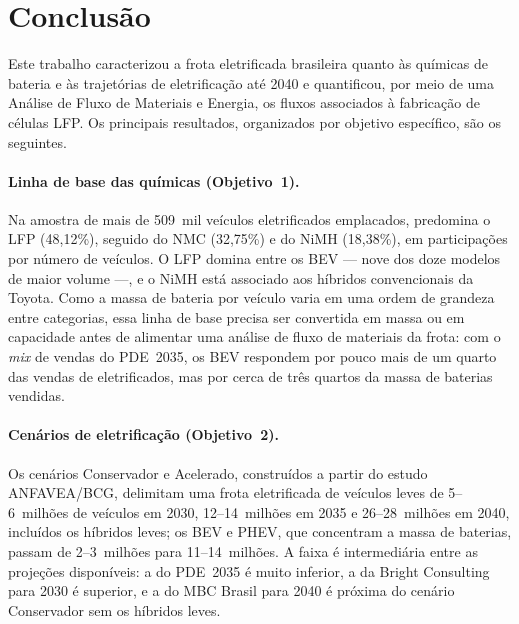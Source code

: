 \newpage
\section{Conclusão}
\label{sec:conclusao}

Este trabalho caracterizou a frota eletrificada brasileira quanto às químicas de
bateria e às trajetórias de eletrificação até 2040 e quantificou, por meio de uma
Análise de Fluxo de Materiais e Energia, os fluxos associados à fabricação de
células LFP. Os principais resultados, organizados por objetivo específico, são
os seguintes.

\paragraph{Linha de base das químicas (Objetivo~1).}
Na amostra de mais de 509~mil veículos eletrificados emplacados, predomina o LFP
(48,12\%), seguido do NMC (32,75\%) e do NiMH (18,38\%), em participações por
número de veículos. O LFP domina entre os BEV — nove dos doze modelos de maior
volume —, e o NiMH está associado aos híbridos convencionais da Toyota. Como a
massa de bateria por veículo varia em uma ordem de grandeza entre categorias, essa
linha de base precisa ser convertida em massa ou em capacidade antes de alimentar
uma análise de fluxo de materiais da frota: com o \textit{mix} de vendas do
PDE~2035, os BEV respondem por pouco mais de um quarto das vendas de eletrificados,
mas por cerca de três quartos da massa de baterias vendidas.

\paragraph{Cenários de eletrificação (Objetivo~2).}
Os cenários Conservador e Acelerado, construídos a partir do estudo ANFAVEA/BCG,
delimitam uma frota eletrificada de veículos leves de 5--6~milhões de veículos em
2030, 12--14~milhões em 2035 e 26--28~milhões em 2040, incluídos os híbridos leves;
os BEV e PHEV, que concentram a massa de baterias, passam de 2--3~milhões para
11--14~milhões. A faixa é intermediária entre as projeções disponíveis: a do
PDE~2035 é muito inferior, a da Bright Consulting para 2030 é superior, e a do MBC
Brasil para 2040 é próxima do cenário Conservador sem os híbridos leves.

